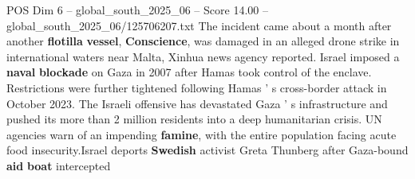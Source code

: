 \begin{textsample}{POS Dim 6 – global\_south\_2025\_06 – Score 14.00 – global\_south\_2025\_06/125706207.txt}
The incident came about a month after another \textbf{flotilla} \textbf{vessel}, \textbf{Conscience}, was damaged in an alleged drone strike in international waters near Malta, Xinhua news agency reported.
Israel imposed a \textbf{naval} \textbf{blockade} on Gaza in 2007 after Hamas took control of the enclave.
Restrictions were further tightened following Hamas ' s cross-border attack in October 2023.
The Israeli offensive has devastated Gaza ' s infrastructure and pushed its more than 2 million residents into a deep humanitarian crisis.
UN agencies warn of an impending \textbf{famine}, with the entire population facing acute food insecurity.Israel deports \textbf{Swedish} activist Greta Thunberg after Gaza-bound \textbf{aid} \textbf{boat} intercepted

\end{textsample}
